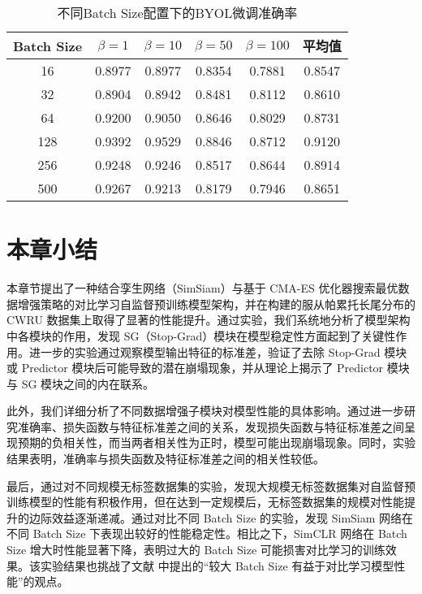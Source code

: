 \documentclass[master]{thesis-uestc}
\begin{document}
\begin{table}[h]
    \centering
    \caption{不同Batch Size配置下的BYOL微调准确率}
    \begin{tabular}{cccccc}
    \hline
    \textbf{Batch Size} & \textbf{$\beta = 1$} & \textbf{$\beta = 10$} & \textbf{$\beta = 50$} & \textbf{$\beta = 100$} & \textbf{平均值} \\
    \hline
    16   & 0.8977 & 0.8977 & 0.8354 & 0.7881 & 0.8547 \\
    32   & 0.8904 & 0.8942 & 0.8481 & 0.8112 & 0.8610 \\
    64   & 0.9200 & 0.9050 & 0.8646 & 0.8029 & 0.8731 \\
    128  & 0.9392 & 0.9529 & 0.8846 & 0.8712 & 0.9120 \\
    256  & 0.9248 & 0.9246 & 0.8517 & 0.8644 & 0.8914 \\
    500  & 0.9267 & 0.9213 & 0.8179 & 0.7946 & 0.8651 \\
    \hline
    \end{tabular}
    \label{tab:batch_size_byol_finetune}
\end{table}

\section{本章小结}
本章节提出了一种结合孪生网络（SimSiam）与基于 CMA-ES 优化器搜索最优数据增强策略的对比学习自监督预训练模型架构，并在构建的服从帕累托长尾分布的 CWRU 数据集上取得了显著的性能提升。通过实验，我们系统地分析了模型架构中各模块的作用，发现 SG（Stop-Grad）模块在模型稳定性方面起到了关键性作用。进一步的实验通过观察模型输出特征的标准差，验证了去除 Stop-Grad 模块或 Predictor 模块后可能导致的潜在崩塌现象，并从理论上揭示了 Predictor 模块与 SG 模块之间的内在联系。

此外，我们详细分析了不同数据增强子模块对模型性能的具体影响。通过进一步研究准确率、损失函数与特征标准差之间的关系，发现损失函数与特征标准差之间呈现预期的负相关性，而当两者相关性为正时，模型可能出现崩塌现象。同时，实验结果表明，准确率与损失函数及特征标准差之间的相关性较低。

最后，通过对不同规模无标签数据集的实验，发现大规模无标签数据集对自监督预训练模型的性能有积极作用，但在达到一定规模后，无标签数据集的规模对性能提升的边际效益逐渐递减。通过对比不同 Batch Size 的实验，发现 SimSiam 网络在不同 Batch Size 下表现出较好的性能稳定性。相比之下，SimCLR 网络在 Batch Size 增大时性能显著下降，表明过大的 Batch Size 可能损害对比学习的训练效果。该实验结果也挑战了文献 \cite{chen2020simple} 中提出的“较大 Batch Size 有益于对比学习模型性能”的观点。
\end{document}
